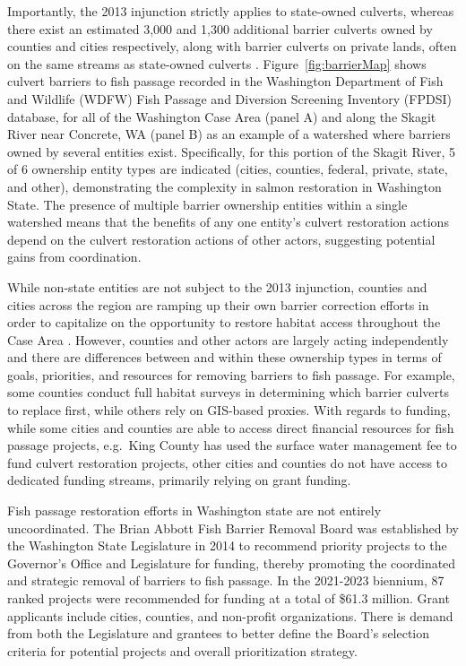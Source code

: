 \documentclass[12pt]{elsarticle}
\begin{document}
Importantly, the 2013 injunction strictly applies to state-owned culverts, whereas there exist an estimated 3,000 and 1,300 additional barrier culverts owned by counties and cities respectively, along with barrier culverts on private lands, often on the same streams as state-owned culverts \citep{brown_coming_2019}. Figure~\ref{fig:barrierMap} shows culvert barriers to fish passage recorded in the Washington Department of Fish and Wildlife (WDFW) Fish Passage and Diversion Screening Inventory (FPDSI) database, for all of the Washington Case Area (panel A) and along the Skagit River near Concrete, WA (panel B) as an example of a watershed where barriers owned by several entities exist. Specifically, for this portion of the Skagit River, 5 of 6 ownership entity types are indicated (cities, counties, federal, private, state, and other), demonstrating the complexity in salmon restoration in Washington State. The presence of multiple barrier ownership entities within a single watershed means that the benefits of any one entity's culvert restoration actions depend on the culvert restoration actions of other actors, suggesting potential gains from coordination. 

While non-state entities are not subject to the 2013 injunction, counties and cities across the region are ramping up their own barrier correction efforts in order to capitalize on the opportunity to restore habitat access throughout the Case Area \citep{brown_coming_2019}. However, counties and other actors are largely acting independently and there are differences between and within these ownership types in terms of goals, priorities, and resources for removing barriers to fish passage. For example, some counties conduct full habitat surveys in determining which barrier culverts to replace first, while others rely on GIS-based proxies. With regards to funding, while some cities and counties are able to access direct financial resources for fish passage projects, e.g.\ King County has used the surface water management fee to fund culvert restoration projects, other cities and counties do not have access to dedicated funding streams, primarily relying on grant funding.  

Fish passage restoration efforts in Washington state are not entirely uncoordinated. The Brian Abbott Fish Barrier Removal Board was established by the Washington State Legislature in 2014 to recommend priority projects to the Governor's Office and Legislature for funding, thereby promoting the coordinated and strategic removal of barriers to fish passage. In the 2021-2023 biennium, 87 ranked projects were recommended for funding at a total of \$61.3 million. Grant applicants include cities, counties, and non-profit organizations. There is demand from both the Legislature and grantees to better define the Board's selection criteria for potential projects and overall prioritization strategy. 
\end{document}

